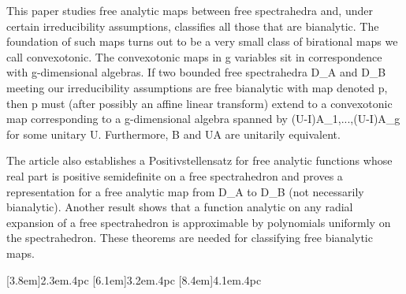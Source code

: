 \documentclass[11pt,makeidx]{amsart}
\begin{document}
This paper studies free analytic maps between free spectrahedra and, under certain irreducibility assumptions, classifies all those that are bianalytic. The foundation of such maps turns out to be a very small class of birational maps we call convexotonic. The convexotonic maps in g variables sit in correspondence with g-dimensional algebras. If two bounded free spectrahedra D_A and D_B meeting our irreducibility assumptions are free bianalytic with map denoted p, then p must (after possibly an affine linear transform) extend to a convexotonic map corresponding to a g-dimensional algebra spanned by (U-I)A_1,...,(U-I)A_g for some unitary U. Furthermore, B and UA are unitarily equivalent.

The article also establishes a Positivstellensatz for free analytic functions whose real part is positive semidefinite on a free spectrahedron and proves a representation for a free analytic map from D_A to D_B (not necessarily bianalytic). Another result shows that a function analytic on any radial expansion of a free spectrahedron is approximable by polynomials uniformly on the spectrahedron. These theorems are needed for classifying free bianalytic maps. 
\fi

\maketitle

\setcounter{tocdepth}{3}
\contentsmargin{2.55em} 
[3.8em]{}{2.3em}{.4pc} 
[6.1em]{}{3.2em}{.4pc}
[8.4em]{}{4.1em}{.4pc}
\end{document}
